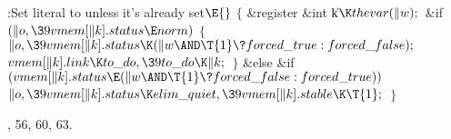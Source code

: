 \Y\B\4:Set literal  to  unless it's already set\X${}%
\E{}$\6
${}\{{}$\1\6
\&{register} \&{int} \|k${}\K\\{thevar}(\|w);{}$\7
\&{if} ${}(\|o,\39\\{vmem}[\|k].\\{status}\E\\{norm}){}$\5
${}\{{}$\1\6
${}\|o,\39\\{vmem}[\|k].\\{status}\K(\|w\AND\T{1}\?\\{forced\_true}:\\{forced%
\_false});{}$\6
${}\\{vmem}[\|k].\\{link}\K\\{to\_do},\39\\{to\_do}\K\|k;{}$\6
\4${}\}{}$\5
\2\&{else} \&{if} ${}(\\{vmem}[\|k].\\{status}\E(\|w\AND\T{1}\?\\{forced%
\_false}:\\{forced\_true})){}$\1\5
${}\|o,\39\\{vmem}[\|k].\\{status}\K\\{elim\_quiet},\39\\{vmem}[\|k].\\{stable}%
\K\T{1};{}$\2\6
\4${}\}{}$\2\par
{}, 56, 60, 63.\fi

